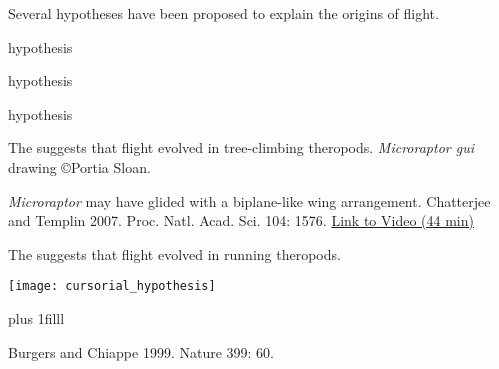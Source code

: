 \documentclass[t]{beamer}
\begin{document}
\begin{frame}[t,plain]{Several hypotheses have been proposed to explain the origins of flight.}

	
	\hangpara {} hypothesis
	
	\vspace{1em}
	
	\hangpara {} hypothesis

	\vspace{1em}
	
	\hangpara {} hypothesis
\end{frame}

{
\begin{frame}[b,plain]{The  suggests that flight evolved in tree-climbing theropods.}
\tiny\hfill\textit{Microraptor gui} drawing \copyright Portia Sloan.
\end{frame}
}

{
\begin{frame}[b,plain]{\textit{Microraptor} may have glided with a biplane-like wing arrangement.}
    \tiny Chatterjee and Templin 2007. Proc. Natl. Acad. Sci. 104: 1576. \hfill\href{https://www.youtube.com/watch?v=yL0UIzU0EEc}{Link to Video (44 min)}
\end{frame}
}

\begin{frame}[t,plain]{The  suggests that flight evolved in running theropods.}
	\begin{center}
		\texttt{[image: cursorial\_hypothesis]}
	\end{center}

	\vskip0pt plus 1filll
	
	\tiny	Burgers and Chiappe 1999. Nature 399: 60.
\end{frame}
\end{document}
